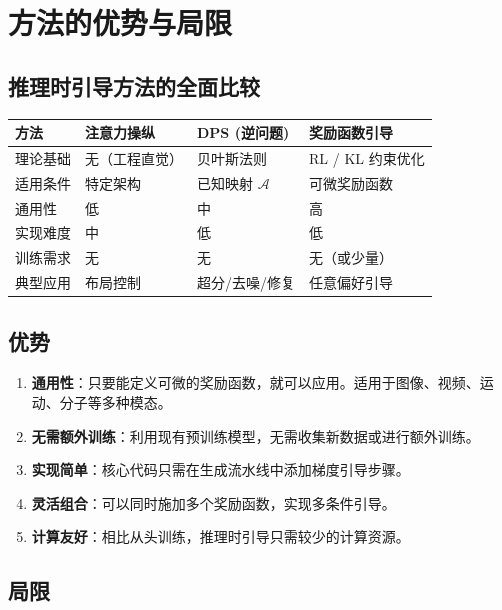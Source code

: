 \section{方法的优势与局限}

\subsection{推理时引导方法的全面比较}

\begin{center}
\begin{tabular}{p{3cm}p{3.5cm}p{3.5cm}p{3.5cm}}
\toprule
\textbf{方法} & \textbf{注意力操纵} & \textbf{DPS (逆问题)} & \textbf{奖励函数引导} \\
\midrule
理论基础 & 无（工程直觉） & 贝叶斯法则 & RL / KL 约束优化 \\
适用条件 & 特定架构 & 已知映射 $\mathcal{A}$ & 可微奖励函数 \\
通用性 & 低 & 中 & 高 \\
实现难度 & 中 & 低 & 低 \\
训练需求 & 无 & 无 & 无（或少量） \\
典型应用 & 布局控制 & 超分/去噪/修复 & 任意偏好引导 \\
\bottomrule
\end{tabular}
\end{center}

\subsection{优势}

\begin{enumerate}
    \item \textbf{通用性}：只要能定义可微的奖励函数，就可以应用。适用于图像、视频、运动、分子等多种模态。
    \item \textbf{无需额外训练}：利用现有预训练模型，无需收集新数据或进行额外训练。
    \item \textbf{实现简单}：核心代码只需在生成流水线中添加梯度引导步骤。
    \item \textbf{灵活组合}：可以同时施加多个奖励函数，实现多条件引导。
    \item \textbf{计算友好}：相比从头训练，推理时引导只需较少的计算资源。
\end{enumerate}

\subsection{局限}

